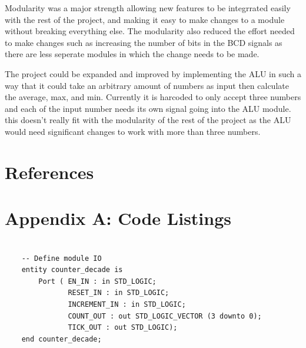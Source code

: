 \documentclass[11pt]{article}
\newenvironment{code}{\captionsetup{type=listing}}{}
\begin{document}
Modularity was a major strength allowing new features to be integrrated easily with the rest of the project, and making it easy to make changes to a module without breaking everything else. The modularity also reduced the effort needed to make changes such as increasing the number of bits in the BCD signals as there are less seperate modules in which the change needs to be made.

The project could be expanded and improved by implementing the ALU in such a way that it could take an arbitrary amount of numbers as input then calculate the average, max, and min. Currently it is harcoded to only accept three numbers and each of the input number needs its own signal going into the ALU module. this doesn't really fit with the modularity of the rest of the project as the ALU would need significant changes to work with more than three numbers.

\newpage

\section{References}
\printbibliography

\newpage

\section{Appendix A: Code Listings}

\begin{code}
  \begin{verbatim}
  
    -- Define module IO
    entity counter_decade is
        Port ( EN_IN : in STD_LOGIC;
               RESET_IN : in STD_LOGIC;
               INCREMENT_IN : in STD_LOGIC;
               COUNT_OUT : out STD_LOGIC_VECTOR (3 downto 0);
               TICK_OUT : out STD_LOGIC);
    end counter_decade;

  \end{verbatim}
  \captionsetup{belowskip=0pt}
  \label{code:entity_naming_convention}
\end{code}
\end{document}
